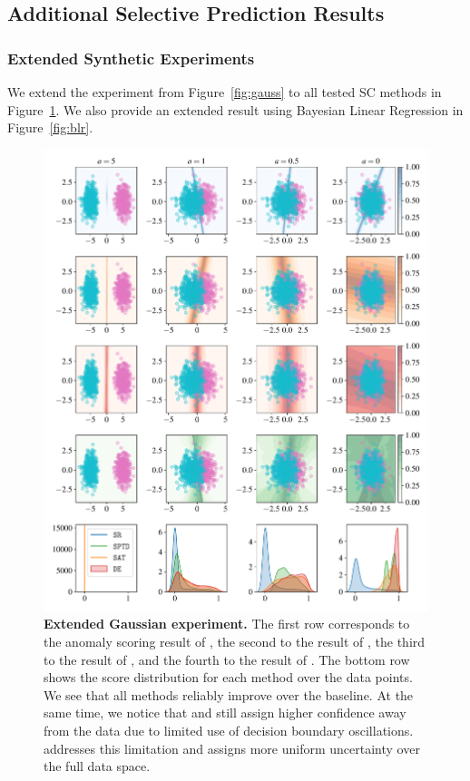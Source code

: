 \subsection{Additional Selective Prediction Results}
\label{app:add_exp}

\subsubsection{Extended Synthetic Experiments}

We extend the experiment from Figure~\ref{fig:gauss} to all tested SC methods in Figure~\ref{fig:gauss_ext}. We also provide an extended result using Bayesian Linear Regression in Figure~\ref{fig:blr}.

\begin{figure}[t]
  \centering
  \includegraphics[width=0.95\linewidth]{figs/sptd/gaussians_2.pdf}
\caption[Extended Gaussian experiment.]{\textbf{Extended Gaussian experiment.}  The first row corresponds to the anomaly scoring result of \sr, the second to the result of \sat, the third to the result of \de, and the fourth to the result of \sptd. The bottom row shows the score distribution for each method over the data points. We see that all methods reliably improve over the \sr baseline. At the same time, we notice that \sat and \de still assign higher confidence away from the data due to limited use of decision boundary oscillations. \sptd addresses this limitation and assigns more uniform uncertainty over the full data space.}
\label{fig:gauss_ext}
\end{figure}

